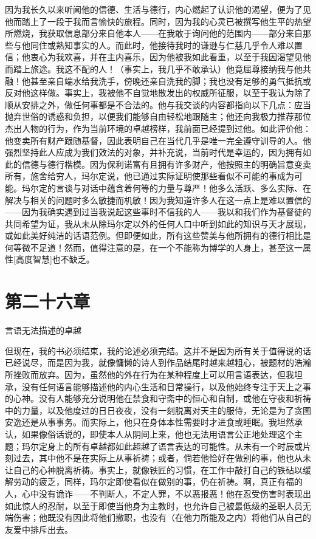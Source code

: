 因为我长久以来听闻他的信德、生活与德行，内心燃起了认识他的渴望，便为了见他而踏上了一段于我而言愉快的旅程。同时，因为我的心灵已被撰写他生平的热望所燃烧，我获取信息部分来自他本人——在我敢于询问他的范围内——部分来自那些与他同住或熟知事实的人。而此时，他接待我时的谦逊与仁慈几乎令人难以置信；他衷心为我欢喜，并在主内喜乐，因为他被我如此看重，以至于我因渴望见他而踏上旅途。我这不配的人！（事实上，我几乎不敢承认）他竟屈尊接纳我与他共融！他甚至亲自端水给我洗手，傍晚还亲自洗我的脚；我也没有足够的勇气抵抗或反对他这样做。事实上，我被他不自觉地散发出的权威所征服，以至于我认为除了顺从安排之外，做任何事都是不合法的。他与我交谈的内容都指向以下几点：应当抛弃世俗的诱惑和负担，以便我们能够自由轻松地跟随主；他还向我极力推荐那位杰出人物的行为，作为当前环境的卓越榜样，我前面已经提到过他。如此评价他：他变卖所有财产跟随基督，因此表明自己在当代几乎是唯一完全遵守训导的人。他强烈坚持此人应成为我们效法的对象，并补充说，当前时代是幸运的，因为拥有如此的信德与德行楷模。因为保利诺富有且拥有许多财产，他按照主的明确旨意变卖所有，施舍给穷人，玛尔定说，他已通过实际证明使那些看似不可能的事成为可能。玛尔定的言谈与对话中蕴含着何等的力量与尊严！他多么活跃、多么实际、在解决与相关的问题时多么敏捷而机敏！因为我知道许多人在这一点上是难以置信的——因为我确实遇到过当我说起这些事时不信我的人——我以和我们作为基督徒的共同希望为证，我从未从除玛尔定以外的任何人口中听到如此的知识与天才展现，或如此美好纯洁的话语范例。但即便如此，所有这些赞美与他所拥有的德行相比是何等微不足道！然而，值得注意的是，在一个不能称为博学的人身上，甚至这一属性[高度智慧]也不缺乏。\par


\section{第二十六章}

言语无法描述的卓越\par

但现在，我的书必须结束，我的论述必须完结。这并不是因为所有关于值得说的话已经说尽，而是因为我，就像慵懒的诗人到作品结尾时越来越粗心，被题材的浩瀚所挫败而放弃。因为，虽然他的外在行为在某种程度上可以用言语表达，但我坦承，没有任何语言能够描述他的内心生活和日常操行，以及他始终专注于天上之事的心神。没有人能够充分说明他在禁食和守斋中的恒心和自制，或他在守夜和祈祷中的力量，以及他度过的日日夜夜，没有一刻脱离对天主的服侍，无论是为了贪图安逸还是从事事务。而实际上，他只在身体本性需要时才进食或睡眠。我坦然承认，如果像俗话说的，即使本人从阴间上来，他也无法用语言公正地处理这个主题；玛尔定身上的所有卓越都如此超越了语言表达的可能性。从未有一个时辰或片刻过去，其中他不是在实际上从事祈祷；或者，倘若他恰好在做别的事，他也从未让自己的心神脱离祈祷。事实上，就像铁匠的习惯，在工作中敲打自己的铁砧以缓解劳动的疲乏，同样，玛尔定即使看似在做别的事，仍在祈祷。啊，真正有福的人，心中没有诡诈——不判断人，不定人罪，不以恶报恶！他在忍受伤害时表现出如此惊人的忍耐，以至于即使当他身为主教时，也允许自己被最低级的圣职人员无端伤害；他既没有因此将他们撤职，也没有（在他力所能及之内）将他们从自己的友爱中排斥出去。\par

